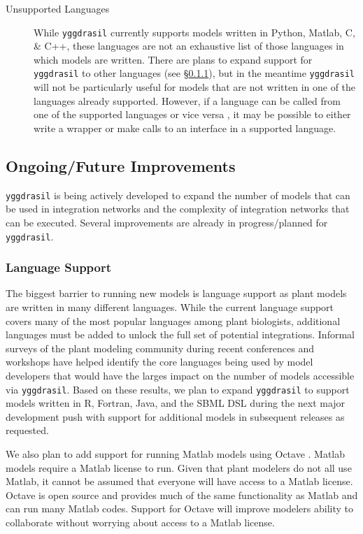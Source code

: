 \documentclass[journal]{IEEEtran}
\newcommand{\pkg}{{\tt yggdrasil}{}}
\begin{document}
\begin{description}
	\item[Unsupported Languages] While {\pkg} currently supports models written in Python, Matlab, C, \& C++, these languages are not an exhaustive list of those languages in which models are written. There are plans to expand support for {\pkg} to other languages (see \S\ref{SS:langsupport}), but in the meantime {\pkg} will not be particularly useful for models that are not written in one of the languages already supported. However, if a language can be called from one of the supported languages or vice versa \citep[e.g. f2py or SWIG,][]{Peterson2009,Beazley2003}, it may be possible to either write a wrapper or make calls to an interface in a supported language.
\end{description}

\subsection{Ongoing/Future Improvements}\label{SS:future}
%
{\pkg} is being actively developed to expand the number of models that can be used in integration networks and the complexity of integration networks that can be executed. Several improvements are already in progress/planned for {\pkg}.

\subsubsection{Language Support}\label{SS:langsupport}
%
The biggest barrier to running new models is language support as plant models are written in many different languages. While the current language support covers many of the most popular languages among plant biologists, additional languages must be added to unlock the full set of potential integrations. Informal surveys of the plant modeling community during recent conferences and workshops have helped identify the core languages being used by model developers that would have the larges impact on the number of models accessible via {\pkg}. Based on these results, we plan to expand {\pkg} to support models written in R, Fortran, Java, and the SBML \citep{Hucka2003} DSL during the next major development push with support for additional models in subsequent releases as requested.

We also plan to add support for running Matlab models using Octave \citep{Eaton2002}. Matlab models require a Matlab license to run. Given that plant modelers do not all use Matlab, it cannot be assumed that everyone will have access to a Matlab license. Octave is open source and provides much of the same functionality as Matlab and can run many Matlab codes. Support for Octave will improve modelers ability to collaborate without worrying about access to a Matlab license. 
\end{document}
